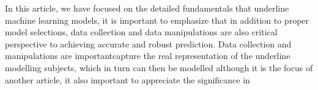 
\par
In this article, we have focused on the detailed fundamentals that underline machine learning models, it is important to emphasize that in addition to proper model selections, data collection and data manipulations are also critical perspective to achieving accurate and robust prediction. Data collection and manipulations are importantcapture the real representation of the underline modelling subjects, which in turn can then be modelled  although it is the focus of another article, it also important to appreciate the significance in 
\par 
